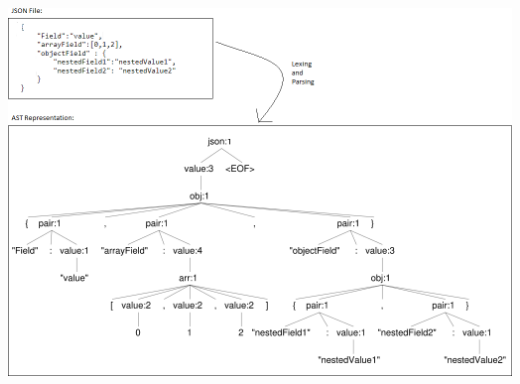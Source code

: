 \documentclass{l4proj}
\begin{document}
\begin{appendices}
\centerline{
    \includegraphics[width =1.2\textwidth]{dissertation/images/json file and AST.png}
}


\pagebreak


\end{appendices}
\end{document}
